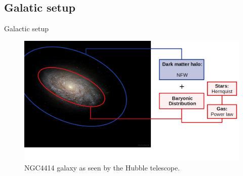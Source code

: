\documentclass[handout]{beamer}
\begin{document}
\subsection{Galatic setup}
\begin{frame}{Galactic setup}
	\begin{figure}[h]
		\centering
		\includegraphics[width=0.8\linewidth]{../Documento/Figures/NGC4414_modified}
		\caption{NGC4414 galaxy as seen by the Hubble telescope.}
	\end{figure}
\end{frame}

%
%		
\end{document}
